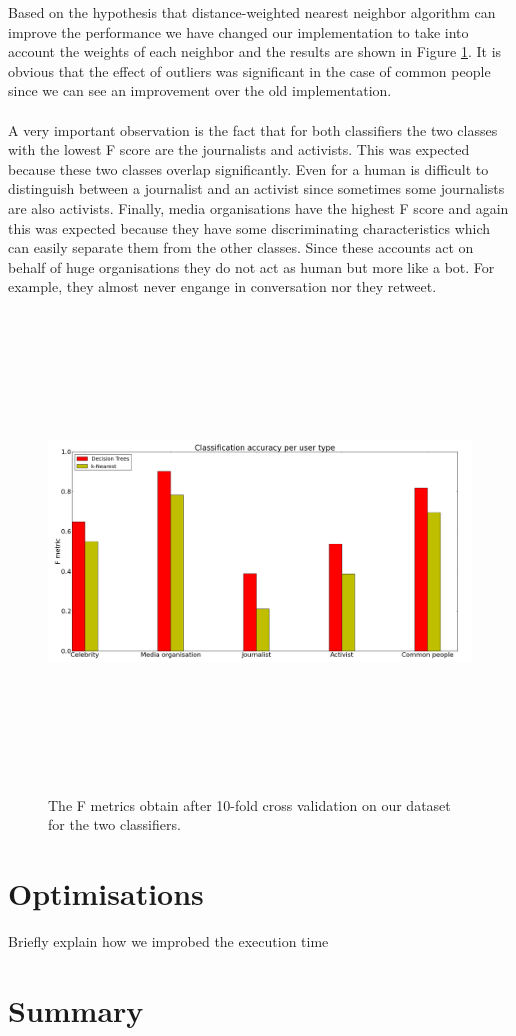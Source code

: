 Based on the hypothesis that distance-weighted nearest neighbor algorithm can improve the performance we have changed our implementation to take into account the weights of each neighbor and the results are shown in Figure \ref{DifferentClassifiersResultsImproved}. It is obvious that the effect of outliers was significant in the case of common people since we can see an improvement over the old implementation.\\\\
A very important observation is the fact that for both classifiers the two classes with the lowest F score are the journalists and activists. This was expected because these two classes overlap significantly. Even for a human is difficult to distinguish between a journalist and an activist since sometimes some journalists are also activists. Finally, media organisations have the highest F score and again this was expected because they have some discriminating characteristics which can easily separate them from the other classes. Since these accounts act on behalf of huge organisations they do not act as human but more like a bot. For example, they almost never engange in conversation nor they retweet.  

\begin{figure}[htbp]
  \begin{center}
    \includegraphics[height=5in, width=6in]{classifiers}
    \caption{The F metrics obtain after 10-fold cross validation on our dataset for the two classifiers.}
    \label{DifferentClassifiersResultsImproved}
  \end{center}
\end{figure}

\section{Optimisations}
Briefly explain how we improbed the execution time

\section{Summary}



